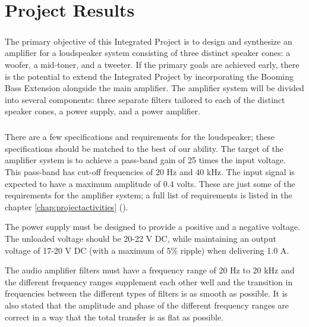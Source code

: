 \chapter{Project Results} 
\label{chap:projectresults}
\setlength{\parindent}{20pt}
\paragraph{}
The primary objective of this Integrated Project is to design and synthesize an amplifier for a loudspeaker system consisting of three distinct speaker cones: a woofer, a mid-toner, and a tweeter.
If the primary goals are achieved early, there is the potential to extend the Integrated Project by incorporating the Booming Bass Extension alongside the main amplifier. The amplifier system will be divided into several components: three separate filters tailored to each of the distinct speaker cones, a power supply, and a power amplifier.
\paragraph{}
There are a few specifications and requirements for the loudspeaker; these specifications should be matched to the best of our ability. The target of the amplifier system is to achieve a pass-band gain of 25 times the input voltage. This pass-band has cut-off frequencies of 20 Hz and 40 kHz\cite{janssen-2024,p. 20}. The input signal is expected to have a maximum amplitude of 0.4 volts.  These are just some of the requirements for the amplifier system; a full list of requirements is listed in the chapter \ref{chap:projectactivities} ().

The power supply must be designed to provide a positive and a negative voltage. The unloaded voltage should be 20-22 V DC, while maintaining an output voltage of 17-20 V DC (with a maximum of 5\% ripple) when delivering 1.0 A.\cite{janssen-2024, p. 18}

The audio amplifier filters must have a frequency range of 20 Hz to 20 kHz and the different frequency ranges supplement each other well and the transition in frequencies between the different types of filters is as smooth as possible. It is also stated that the amplitude and phase of the different frequency ranges are correct in a way that the total transfer is as flat as possible. \cite{janssen-2024, p.19}

